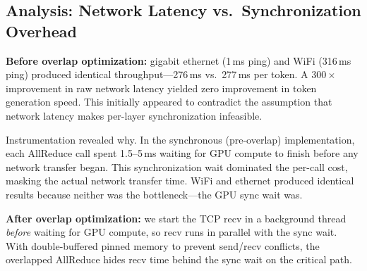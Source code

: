 \documentclass[10pt,twocolumn]{article}
\begin{document}
\begin{table}[t]
\centering
\caption{Performance comparison across configurations.}
\label{tab:benchmarks}
\smallskip
{}
\end{table}

\subsection{Analysis: Network Latency vs.\ Synchronization Overhead}\label{sec:eval-analysis}

\textbf{Before overlap optimization:} gigabit ethernet (1\,ms ping) and
WiFi (316\,ms ping) produced identical throughput---276\,ms vs.\ 277\,ms
per token.  A $300\times$ improvement in raw network latency yielded zero
improvement in token generation speed.  This initially appeared to
contradict the assumption that network latency makes per-layer
synchronization infeasible.

Instrumentation revealed why.  In the synchronous (pre-overlap)
implementation, each AllReduce call spent 1.5--5\,ms waiting for GPU
compute to finish before any network transfer began.  This synchronization
wait dominated the per-call cost, masking the actual network transfer time.
WiFi and ethernet produced identical results because neither was the
bottleneck---the GPU sync wait was.

\textbf{After overlap optimization:} we start the TCP recv in a background
thread \emph{before} waiting for GPU compute, so recv runs in parallel
with the sync wait.  With double-buffered pinned memory to prevent
send/recv conflicts, the overlapped AllReduce hides recv time behind the
sync wait on the critical path.
\end{document}
